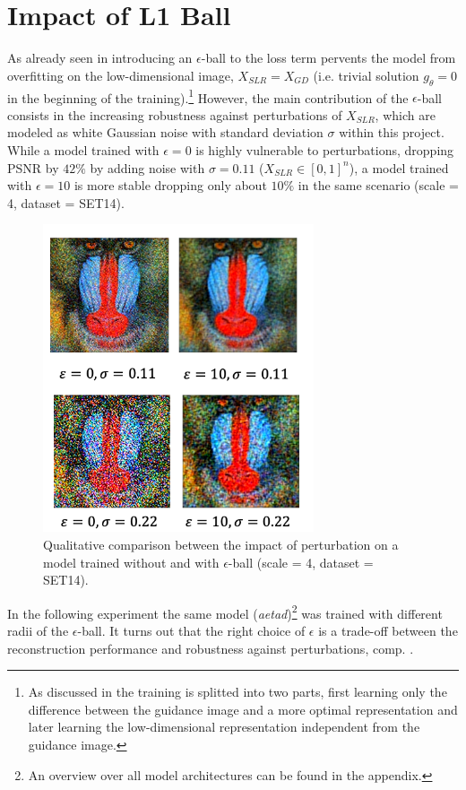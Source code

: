 \section{Impact of L1 Ball}
\label{sec:Experiments_EPS_BALL}
As already seen in  introducing an $\epsilon$-ball to the loss term pervents the model from overfitting on the low-dimensional image, $X_{SLR} = X_{GD}$ (i.e. trivial solution $g_\theta = 0$ in the beginning of the training).\footnote{As discussed in  the training is splitted into two parts, first learning only the difference between the guidance image and a more optimal representation and later learning the low-dimensional representation independent from the guidance image.} However, the main contribution of the $\epsilon$-ball consists in the increasing robustness against perturbations of $X_{SLR}$, which are modeled as white Gaussian noise with standard deviation $\sigma$ within this project. While a model trained with $\epsilon = 0$ is highly vulnerable to perturbations,
dropping \ac{PSNR} by $42 \%$ by adding noise with $\sigma = 0.11$ ($X_{SLR} \in [0,1]^n$), a model trained with $\epsilon = 10$ is more stable dropping only about $10 \%$ in the same scenario (scale = 4, dataset = SET14).

\begin{figure}[!htbp]
	\centering
	\includegraphics[width=8cm]{figures/epsball_qualitative_comp}
	\caption{Qualitative comparison between the impact of perturbation on a
  model trained without and with $\epsilon$-ball (scale = 4, dataset = SET14).}
  \label{fig:epsball_qualitative_comp}
\end{figure}

In the following experiment the same model (\textit{aetad})\footnote{An overview over all model architectures can be found in the appendix.} was trained with different radii of the $\epsilon$-ball. It turns out that the right choice of $\epsilon$ is a trade-off between the reconstruction performance and robustness against perturbations, comp. .

